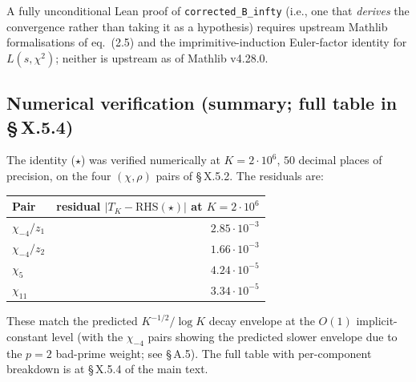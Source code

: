 A fully unconditional Lean proof of \texttt{corrected\_B\_infty} (i.e., one
that \emph{derives} the convergence rather than taking it as a hypothesis)
requires upstream Mathlib formalisations of \cite{Akatsuka2017EulerProduct}
eq.~(2.5) and the imprimitive-induction Euler-factor identity for
\(L(s, \chi^2)\); neither is upstream as of Mathlib v4.28.0.

\subsection{Numerical verification (summary; full table in \S\,X.5.4)}

The identity (\(\star\)) was verified numerically at \(K = 2 \cdot 10^6\),
\(50\) decimal places of precision, on the four
\((\chi, \rho)\) pairs of \S\,X.5.2. The residuals are:

{\def\LTcaptype{none} %
\begin{longtable}[]{@{}lr@{}}
\toprule\noalign{}
Pair & residual \(|T_K - \mathrm{RHS}(\star)|\) at \(K = 2\cdot 10^6\) \\
\midrule\noalign{}
\endhead
\bottomrule\noalign{}
\endlastfoot
\(\chi_{-4}/z_1\) & \(2.85 \cdot 10^{-3}\) \\
\(\chi_{-4}/z_2\) & \(1.66 \cdot 10^{-3}\) \\
\(\chi_5\) & \(4.24 \cdot 10^{-5}\) \\
\(\chi_{11}\) & \(3.34 \cdot 10^{-5}\) \\
\end{longtable}
}

These match the predicted \(K^{-1/2}/\log K\) decay envelope at the
\(O(1)\) implicit-constant level (with the \(\chi_{-4}\) pairs showing the
predicted slower envelope due to the \(p=2\) bad-prime weight; see \S\,A.5).
The full table with per-component breakdown is at \S\,X.5.4 of the main
text.
